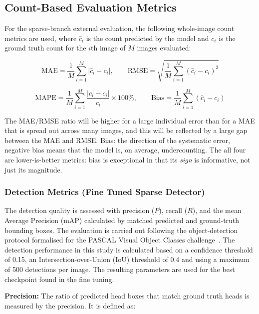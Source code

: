 \subsection{Count-Based Evaluation Metrics}

For the sparse-branch external evaluation, the following whole-image count metrics are used, where $\hat c_i$ is the count predicted by the model and $c_i$ is the ground truth count for the $i$th image of $M$ images evaluated:

\begin{equation}
	\text{MAE} = \frac{1}{M}\sum_{i=1}^{M} \left| \hat{c}_i - c_i \right|, \qquad
	\text{RMSE} = \sqrt{ \frac{1}{M}\sum_{i=1}^{M} \left( \hat{c}_i - c_i \right)^2 }
\end{equation}

\begin{equation}
	\text{MAPE} = \frac{1}{M}\sum_{i=1}^{M} \frac{\left| \hat{c}_i - c_i \right|}{c_i} \times 100\%, \qquad
	\text{Bias} = \frac{1}{M}\sum_{i=1}^{M} \left( \hat{c}_i - c_i \right)
\end{equation}

The MAE/RMSE ratio will be higher for a large individual error than for a MAE that is spread out across many images, and this will be reflected by a large gap between the MAE and RMSE. Bias: the direction of the systematic error, negative bias means that the model is, on average, undercounting. The all four are lower-is-better metrics: bias is exceptional in that its \emph{sign} is informative, not just its magnitude.

\subsubsection{Detection Metrics (Fine Tuned Sparse Detector)}

The detection quality is assessed with precision ($P$), recall ($R$), and the mean Average Precision (mAP) calculated by matched predicted and ground-truth bounding boxes. The evaluation is carried out following the object-detection protocol formalised for the PASCAL Visual Object Classes challenge~\cite{everingham2010voc}. The detection performance in this study is calculated based on a confidence threshold of 0.15, an Intersection-over-Union (IoU) threshold of 0.4 and using a maximum of 500 detections per image. The resulting parameters are used for the best checkpoint found in the fine tuning.

\textbf{Precision:} The ratio of predicted head boxes that match ground truth heads is measured by the precision. It is defined as:

